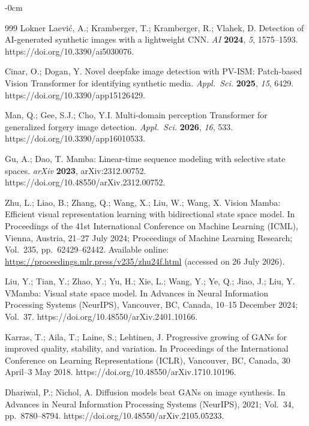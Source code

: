 \documentclass[applsci,article,submit,pdftex,moreauthors]{Definitions/mdpi}
\begin{document}
\begin{adjustwidth}{-\extralength}{0cm}
{\begin{thebibliography}{999}
Lokner La{\dj}evi{\'c}, A.; Kramberger, T.; Kramberger, R.; Vlahek, D. Detection of AI-generated synthetic images with a lightweight CNN. {\em AI} {\bf 2024}, {\em 5}, 1575--1593. https://doi.org/10.3390/ai5030076.

Cinar, O.; Dogan, Y. Novel deepfake image detection with PV-ISM: Patch-based Vision Transformer for identifying synthetic media. {\em Appl.\ Sci.} {\bf 2025}, {\em 15}, 6429. https://doi.org/10.3390/app15126429.

Man, Q.; Gee, S.J.; Cho, Y.I. Multi-domain perception Transformer for generalized forgery image detection. {\em Appl.\ Sci.} {\bf 2026}, {\em 16}, 533. https://doi.org/10.3390/app16010533.

Gu, A.; Dao, T. Mamba: Linear-time sequence modeling with selective state spaces. {\em arXiv} {\bf 2023}, arXiv:2312.00752. https://doi.org/10.48550/arXiv.2312.00752.

Zhu, L.; Liao, B.; Zhang, Q.; Wang, X.; Liu, W.; Wang, X. Vision Mamba: Efficient visual representation learning with bidirectional state space model. In Proceedings of the 41st International Conference on Machine Learning (ICML), Vienna, Austria, 21--27 July 2024; Proceedings of Machine Learning Research; Vol.~235, pp.~62429--62442. Available online: \url{https://proceedings.mlr.press/v235/zhu24f.html} (accessed on 26 July 2026).

Liu, Y.; Tian, Y.; Zhao, Y.; Yu, H.; Xie, L.; Wang, Y.; Ye, Q.; Jiao, J.; Liu, Y. VMamba: Visual state space model. In Advances in Neural Information Processing Systems (NeurIPS), Vancouver, BC, Canada, 10--15 December 2024; Vol.~37. https://doi.org/10.48550/arXiv.2401.10166.

Karras, T.; Aila, T.; Laine, S.; Lehtinen, J. Progressive growing of GANs for improved quality, stability, and variation. In Proceedings of the International Conference on Learning Representations (ICLR), Vancouver, BC, Canada, 30 April--3 May 2018. https://doi.org/10.48550/arXiv.1710.10196.

Dhariwal, P.; Nichol, A. Diffusion models beat GANs on image synthesis. In Advances in Neural Information Processing Systems (NeurIPS), 2021; Vol.~34, pp.~8780--8794. https://doi.org/10.48550/arXiv.2105.05233.


\end{thebibliography}}
\end{adjustwidth}
\end{document}
